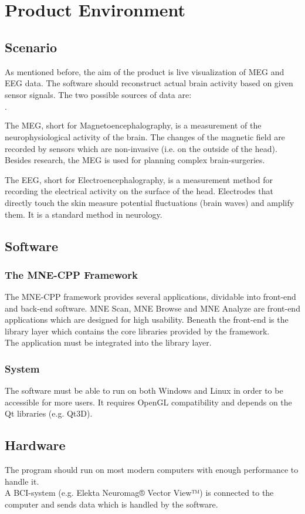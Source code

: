 \section {Product Environment}
\subsection{Scenario}
As mentioned before, the aim of the product is live visualization of MEG and EEG data. The software should reconstruct actual brain activity based on given sensor signals.
The two possible sources of data are:
\begin{list}{$\cdot$}{}

\item The MEG, short for Magnetoencephalography, is a measurement of the neurophysiological activity of the brain. The changes of the magnetic field are recorded by sensors which are non-invasive (i.e. on the outside of the head). Besides research, the MEG is used for planning complex brain-surgeries.

\item The EEG, short for Electroencephalography, is a measurement method for recording the electrical activity on the surface of the head. Electrodes that directly touch the skin measure potential fluctuations (brain waves) and amplify them. It is a standard method in neurology.
\end{list}

\subsection{Software}
\subsubsection{The MNE-CPP Framework}The MNE-CPP framework provides several applications, dividable into front-end and back-end software. MNE Scan, MNE Browse and MNE Analyze are front-end applications which are designed for high usability.
Beneath the front-end is the library layer which contains the core libraries provided by the framework.\\
The application must be integrated into the library layer.
\subsubsection{System}
The software must be able to run on both Windows and Linux in order to be accessible for more users. It requires OpenGL compatibility and depends on the Qt libraries (e.g. Qt3D).
\subsection{Hardware}
The program should run on most modern computers with enough performance to handle it. \\
A BCI-system (e.g. Elekta Neuromag® Vector View™) is connected to the computer and sends data which is handled by the software.